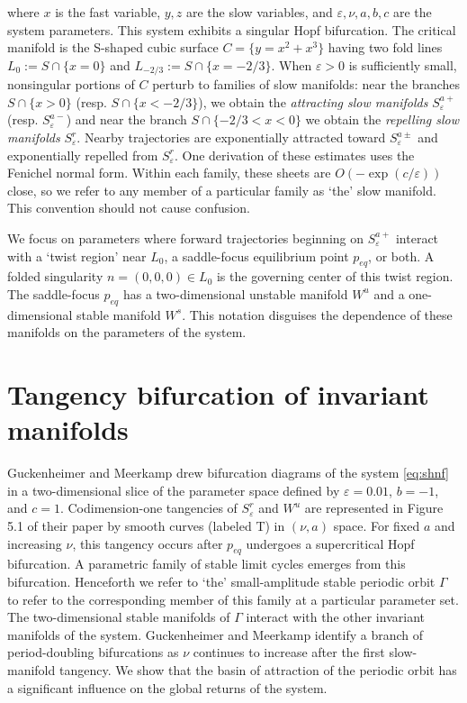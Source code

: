 \documentclass[aip, cha, sd, amsmath,amssymb, preprint]{revtex4-1}
\begin{document}
where $x$ is the fast variable, $y,z$ are the slow variables, and ${ \varepsilon},\nu,a,b,c$ are the system parameters. This system exhibits a singular Hopf bifurcation.\cite{braaksma1998,guckenheimer2008siam,guckenheimer2012dcds} The critical manifold is the S-shaped cubic surface $C = \{y = x^2 + x^3\}$ having two fold lines $L_0 := S \cap \{x = 0\}$ and $L_{-2/3} := S \cap \{ x = -2/3\}$. When ${ \varepsilon} > 0 $ is sufficiently small, nonsingular portions of $C$ perturb to families of slow manifolds: near the branches $S\cap \{x > 0\}$ (resp. $S \cap \{x < -2/3\}$), we obtain the {\it attracting slow manifolds} $S^{a+}_{ \varepsilon}$ (resp. $S^{a-}_{ \varepsilon}$) and near the branch $S\cap\{-2/3<x<0\}$ we obtain the {\it repelling slow manifolds} $S^r_{ \varepsilon}$. Nearby trajectories are exponentially attracted toward $S^{a\pm}_{ \varepsilon}$ and exponentially repelled from $S^r_{ \varepsilon}$. One derivation of these estimates uses the Fenichel normal form.\cite{jones1994} Within each family, these sheets are $O(-\exp(c/ { \varepsilon}))$ close\cite{jones1994,jones1995}, so we refer to any member of a particular family as `the' slow manifold. This convention should not cause confusion. 

We focus on parameters where forward trajectories beginning on $S^{a+}_{ \varepsilon}$ interact with a `twist region' near $L_0$, a saddle-focus equilibrium point $p_{eq}$, or both. A folded singularity $n =(0,0,0) \in L_0$ is the governing center of this twist region. The saddle-focus $p_{eq}$ has a two-dimensional unstable manifold $W^u$ and a one-dimensional stable manifold $W^s$. This notation disguises the dependence of these manifolds on the parameters of the system.

\section{Tangency bifurcation of invariant manifolds}

Guckenheimer and Meerkamp\cite{guckenheimer2012siam} drew bifurcation diagrams of the system \eqref{eq:shnf} in a two-dimensional slice of the parameter space defined by ${ \varepsilon} = 0.01$, $b = -1$, and $c = 1$. Codimension-one tangencies of $S^r_{ \varepsilon}$ and $W^u$ are represented in Figure 5.1 of their paper by smooth curves (labeled T) in $(\nu,a)$ space. For fixed $a$ and increasing $\nu$, this tangency occurs after $p_{eq}$ undergoes a supercritical Hopf bifurcation. A parametric family of stable limit cycles emerges from this bifurcation. Henceforth we refer to `the' small-amplitude stable periodic orbit $\Gamma$ to refer to the corresponding member of this family at a particular parameter set. The two-dimensional stable manifolds of $\Gamma$ interact with the other invariant manifolds of the system. Guckenheimer and Meerkamp identify a branch of period-doubling bifurcations as $\nu$ continues to increase after the first slow-manifold tangency. We show that the basin of attraction of the periodic orbit has a significant influence on the global returns of the system.
\end{document}
